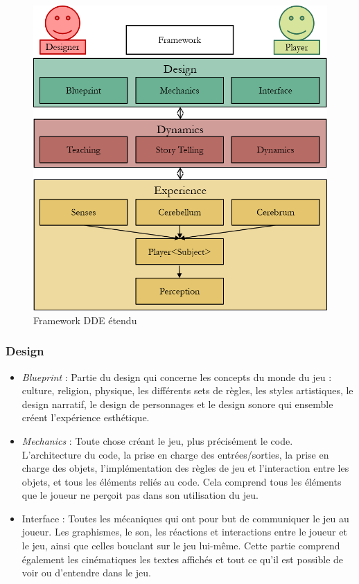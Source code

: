 \begin{figure}[H]
    \begin{center}
    \includegraphics[width=13cm]{10_img/chap3/dde_extended_modif.png} 
    \caption{Framework DDE étendu \cite{DDE}}
    \label{fig.dde_extended}
    \end{center}
\end{figure}

\subsubsection{Design}
    \begin{itemize}
        \item \emph{Blueprint} : Partie du design qui concerne les concepts du monde du jeu : culture, religion, physique, les différents sets de règles, les styles artistiques, le design narratif, le design de personnages et le design sonore qui ensemble créent l'expérience esthétique.
        \item \emph{Mechanics} : Toute chose créant le jeu, plus précisément le code. L'architecture du code, la prise en charge des entrées/sorties, la prise en charge des objets, l'implémentation des règles de jeu et l'interaction entre les objets, et tous les éléments reliés au code. Cela comprend tous les éléments que le joueur ne perçoit pas dans son utilisation du jeu.
        \item Interface : Toutes les mécaniques qui ont pour but de communiquer le jeu au joueur. Les graphismes, le son, les réactions et interactions entre le joueur et le jeu, ainsi que celles bouclant sur le jeu lui-même. Cette partie comprend également les cinématiques les textes affichés et tout ce qu'il est possible de voir ou d'entendre dans le jeu.
    \end{itemize}

